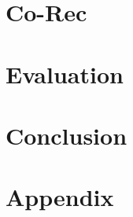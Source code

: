 \documentclass[12pt, twoside]{report}
\begin{document}
    \chapter{Co-Rec}
    
    
    \chapter{Evaluation}
    
    
    \chapter{Conclusion}
    
    
    \appendix
    \chapter{Appendix}
    
    
    \printbibliography
\end{document}
